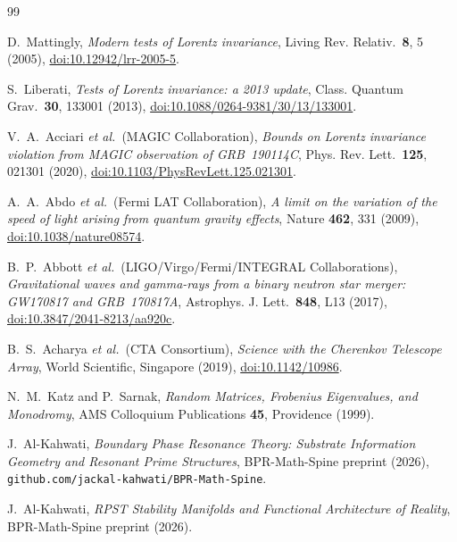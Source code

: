 \documentclass[aps,prd,twocolumn,showpacs,preprintnumbers]{revtex4-2}
\begin{document}
\begin{thebibliography}{99}

D.~Mattingly,
\textit{Modern tests of Lorentz invariance},
Living Rev. Relativ.\ \textbf{8}, 5 (2005),
\href{https://doi.org/10.12942/lrr-2005-5}{doi:10.12942/lrr-2005-5}.

S.~Liberati,
\textit{Tests of Lorentz invariance: a 2013 update},
Class. Quantum Grav.\ \textbf{30}, 133001 (2013),
\href{https://doi.org/10.1088/0264-9381/30/13/133001}{doi:10.1088/0264-9381/30/13/133001}.

V.~A.~Acciari \textit{et al.}\ (MAGIC Collaboration),
\textit{Bounds on Lorentz invariance violation from MAGIC observation of
GRB~190114C},
Phys. Rev. Lett.\ \textbf{125}, 021301 (2020),
\href{https://doi.org/10.1103/PhysRevLett.125.021301}{doi:10.1103/PhysRevLett.125.021301}.

A.~A.~Abdo \textit{et al.}\ (Fermi LAT Collaboration),
\textit{A limit on the variation of the speed of light arising from quantum
gravity effects},
Nature \textbf{462}, 331 (2009),
\href{https://doi.org/10.1038/nature08574}{doi:10.1038/nature08574}.

B.~P.~Abbott \textit{et al.}\ (LIGO/Virgo/Fermi/INTEGRAL Collaborations),
\textit{Gravitational waves and gamma-rays from a binary neutron star merger:
GW170817 and GRB~170817A},
Astrophys. J. Lett.\ \textbf{848}, L13 (2017),
\href{https://doi.org/10.3847/2041-8213/aa920c}{doi:10.3847/2041-8213/aa920c}.

B.~S.~Acharya \textit{et al.}\ (CTA Consortium),
\textit{Science with the Cherenkov Telescope Array},
World Scientific, Singapore (2019),
\href{https://doi.org/10.1142/10986}{doi:10.1142/10986}.

N.~M.~Katz and P.~Sarnak,
\textit{Random Matrices, Frobenius Eigenvalues, and Monodromy},
AMS Colloquium Publications \textbf{45}, Providence (1999).

J.~Al-Kahwati,
\textit{Boundary Phase Resonance Theory: Substrate Information Geometry and
Resonant Prime Structures},
BPR-Math-Spine preprint (2026),
\texttt{github.com/jackal-kahwati/BPR-Math-Spine}.

J.~Al-Kahwati,
\textit{RPST Stability Manifolds and Functional Architecture of Reality},
BPR-Math-Spine preprint (2026).


\end{thebibliography}
\end{document}
